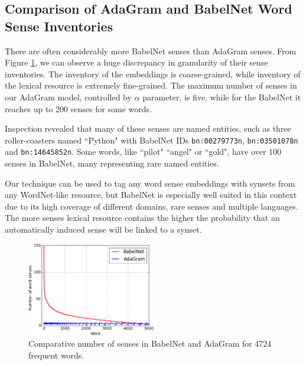 \documentclass[10pt, a4paper]{article}
\begin{document}
\subsection{Comparison of AdaGram and BabelNet Word Sense Inventories}

There are often considerably more BabelNet senses than AdaGram senses. From Figure \ref{fig:sensescomp}, we can observe a huge discrepancy in granularity of their sense inventories. The inventory of the embeddings is coarse-grained, while inventory of the lexical resource is extremely fine-grained. The maximum number of senses in our AdaGram model, controlled by $\alpha$ parameter, is five, while for the BabelNet it reaches up to 200 senses for some words. 


Inspection revealed that many of these senses are named entities, such as three roller-coasters named ``Python" with BabelNet IDs \texttt{\small bn:00279773n}, \texttt{\small bn:03501078n} and \texttt{\small bn:14645852n}. Some words, like ``pilot" ``angel" or ``gold", have over 100 senses in BabelNet, many representing rare named entities. 

Our technique can be used to tag any word sense embeddings with synsets from any WordNet-like resource, but BabelNet is especially well suited in this context due to its high coverage of different domains, rare senses and multiple languages. The more senses lexical resource contains the higher the probability that an automatically induced sense will be linked to a synset.

\begin{figure}
	\begin{center}
	\includegraphics[width=0.5\textwidth]{figures/number-of-senses-150}
	\end{center}
	\caption{ Comparative number of senses in BabelNet and AdaGram for  4724 frequent words.}
	\label{fig:sensescomp}
\end{figure}
\end{document}
